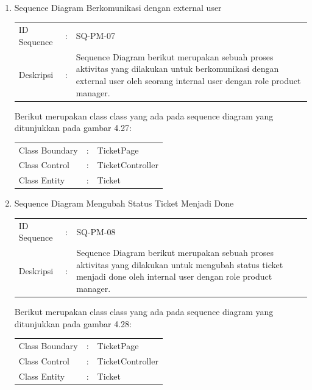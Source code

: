 \documentclass[12pt]{article}
\begin{document}
\begin{enumerate}[label=\textbf{4.\arabic*.}]
\begin{enumerate} [label=\textbf{4.2.\arabic*.}, wide, labelwidth=!, labelindent=0pt]
\begin{enumerate}[label=\textbf{4.2.2.\arabic*.}, wide, labelwidth=!, labelindent=0pt]
\begin{enumerate}[label=\arabic*.]
\begin{tabularx}{.9\linewidth}{@{} l l X @{}}
                \end{tabularx}
            
                
                \item Sequence Diagram Berkomunikasi dengan external user
                
                \begin{tabularx}{.9\linewidth}{@{} l l X @{}}
                    ID Sequence &	: & SQ-PM-07 \\
                    Deskripsi &	: & Sequence Diagram berikut merupakan sebuah proses aktivitas yang dilakukan untuk berkomunikasi dengan external user oleh seorang internal user dengan role product manager. 
        
                \end{tabularx}

                \noindent Berikut merupakan class class yang ada pada sequence diagram yang ditunjukkan pada gambar 4.27:

                \begin{tabularx}{.9\linewidth}{@{} l l X @{}}
                    Class Boundary & : & TicketPage \\
                    Class Control & : & TicketController \\
                    Class Entity & : & Ticket
                
                \end{tabularx}


                \item Sequence Diagram Mengubah Status Ticket Menjadi Done
                
                \begin{tabularx}{.9\linewidth}{@{} l l X @{}}
                    ID Sequence &	: & SQ-PM-08 \\
                    Deskripsi &	: & Sequence Diagram berikut merupakan sebuah proses aktivitas yang dilakukan untuk mengubah status ticket menjadi done oleh internal user dengan role product manager. 
        
                \end{tabularx}

                \noindent Berikut merupakan class class yang ada pada sequence diagram yang ditunjukkan pada gambar 4.28:

                \begin{tabularx}{.9\linewidth}{@{} l l X @{}}
                    Class Boundary & : & TicketPage \\
                    Class Control & : & TicketController \\
                    Class Entity & : & Ticket
                

\end{tabularx}
\end{enumerate}
\end{enumerate}
\end{enumerate}
\end{enumerate}
\end{document}
